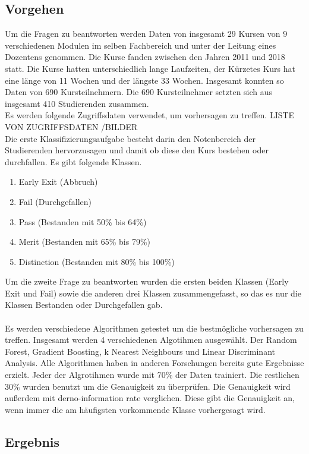\subsection{Vorgehen}
Um die Fragen zu beantworten werden Daten von insgesamt 29 Kursen von 9 verschiedenen Modulen im selben Fachbereich und unter der Leitung eines Dozentens genommen.
Die Kurse fanden zwischen den Jahren 2011 und 2018 statt. Die Kurse hatten unterschiedlich lange Laufzeiten, der Kürzetes Kurs hat eine länge von 11 Wochen und der längste 33 Wochen.
Insgesamt konnten so Daten von 690 Kursteilnehmern. Die 690 Kursteilnehmer setzten sich aus insgesamt 410 Studierenden zusammen. 
\\
Es werden folgende Zugriffsdaten verwendet, um vorhersagen zu treffen.
LISTE VON ZUGRIFFSDATEN /BILDER 
\\
\noindent
Die erste Klassifizierungsaufgabe besteht darin den Notenbereich der Studierenden hervorzusagen und damit ob diese den Kurs bestehen oder durchfallen. Es gibt folgende Klassen.
\begin{enumerate}
    \item Early Exit (Abbruch)
    \item Fail (Durchgefallen)
    \item Pass (Bestanden mit 50\% bis 64\%)
    \item Merit (Bestanden mit 65\% bis 79\%)
    \item Distinction (Bestanden mit 80\% bis 100\%)
\end{enumerate}
Um die zweite Frage zu beantworten wurden die ersten beiden Klassen (Early Exit und Fail) sowie die anderen drei Klassen zusammengefasst, so das es nur die Klassen Bestanden oder Durchgefallen gab.
\\
\noindent
\\
\noindent
Es werden verschiedene Algorithmen getestet um die bestmögliche vorhersagen zu treffen. Insgesamt werden 4 verschiedenen Algotihmen ausgewählt. Der Random Forest, Gradient Boosting, k Nearest
Neighbours und Linear Discriminant Analysis. Alle Algorithmen haben in anderen Forschungen bereits gute Ergebnisse erzielt. Jeder der Algrotihmen wurde mit 70\% der Daten trainiert.
Die restlichen 30\% wurden benutzt um die Genauigkeit zu überprüfen. Die Genauigkeit wird außerdem mit der\glqq no-information rate\grqq{} verglichen.
Diese gibt die Genauigkeit an, wenn immer die am häufigsten vorkommende Klasse vorhergesagt wird. 

\subsection{Ergebnis}
